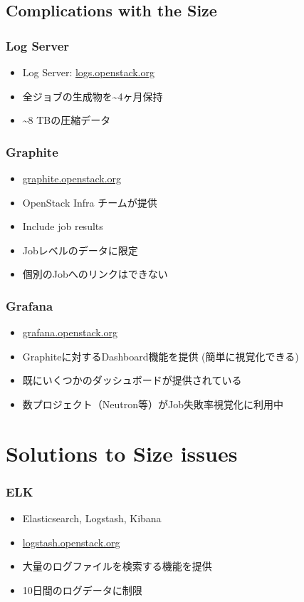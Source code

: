 \documentclass[aspectratio=169,11pt,hyperref={colorlinks=true}]{beamer}
\begin{document}
\subsection{Complications with the Size}
\begin{frame}
    \frametitle{Log Server}
    \begin{itemize}
        \item Log Server: \href{http://logs.openstack.org/}{logs.openstack.org}
        \item 全ジョブの生成物を\textasciitilde4ヶ月保持
        \item \textasciitilde8 TBの圧縮データ
    \end{itemize}
\end{frame}

\begin{frame}
    \frametitle{Graphite}
    \begin{itemize}
        \item \href{http://graphite.openstack.org/}{graphite.openstack.org}
        \item OpenStack Infra チームが提供
        \item Include job results
        \item Jobレベルのデータに限定
        \item 個別のJobへのリンクはできない
    \end{itemize}
\end{frame}

\begin{frame}
    \frametitle{Grafana}
    \begin{itemize}
        \item \href{http://grafana.openstack.org/}{grafana.openstack.org}
        \item Graphiteに対するDashboard機能を提供 (簡単に視覚化できる)
        \item 既にいくつかのダッシュボードが提供されている
        \item 数プロジェクト（Neutron等）がJob失敗率視覚化に利用中
    \end{itemize}
\end{frame}


\section{Solutions to Size issues}
\begin{frame}
    \frametitle{ELK}
    \begin{itemize}
        \item Elasticsearch, Logstash, Kibana
        \item \href{http://logstash.openstack.org}{logstash.openstack.org}
        \item 大量のログファイルを検索する機能を提供
        \item 10日間のログデータに制限
    \end{itemize}
\end{frame}
\end{document}
